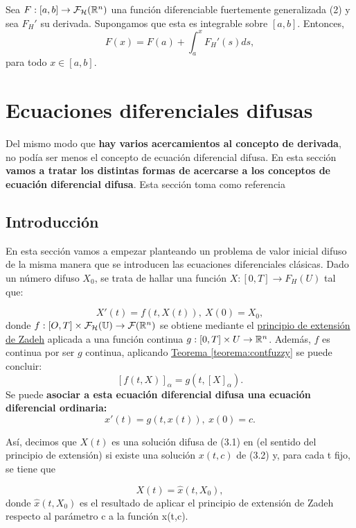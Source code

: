 \begin{teorema}
  Sea $F : [a, b] \rightarrow  \mathcal{F}_\mathcal{H} (\mathbb R^n)$ una función diferenciable fuertemente generalizada (2) y sea $F_H'$ su derivada. Supongamos que esta es integrable sobre $[a, b]$. Entonces,
  \[
  F(x) = F(a) + \int_{a}^{x}F_H'(s) ds,
  \]
  para todo $x \in [a, b]$.
\end{teorema}

\section{Ecuaciones diferenciales difusas}
Del mismo modo que \textbf{hay varios acercamientos al concepto de derivada}, no podía ser menos el concepto de ecuación diferencial difusa. En esta sección \textbf{vamos a tratar los distintas formas de acercarse a los conceptos de ecuación diferencial difusa}. Esta sección toma como referencia \cite{fuzzyapproaches}

\subsection{Introducción}
En esta sección vamos a empezar planteando un problema de valor inicial difuso de la misma manera que se introducen las ecuaciones diferenciales clásicas. Dado un número difuso $X_0$, se trata de hallar una función $X:[0,T] \rightarrow F_H(U)$ tal que:

\begin{equation}
  \label{def:edf}
  X'(t) = f(t, X(t)), ~ X(0) = X_0,
\end{equation}
donde $f : [O, T] \times \mathcal{F}_\mathcal{H}(\mathbb U) \rightarrow \mathcal{F}(\mathbb R^n)$ se obtiene mediante el \hyperref[def:zadeh]{principio de extensión de Zadeh} aplicada a una función continua $g : [0, T] \times U \rightarrow \mathbb R^n$. Además, $f$  es continua por ser $g$ continua, aplicando \hyperref[teorema:contfuzzy]{Teorema \ref*{teorema:contfuzzy}} se puede concluir:
\[
	[f(t, X)]_\alpha = g(t, [X]_\alpha).
\]
Se puede \textbf{asociar a esta ecuación diferencial difusa una ecuación diferencial ordinaria:}
\begin{equation}
	\label{eq:edo}
	x'(t) = g(t, x(t)), ~ x(0) = c.
\end{equation}

Así, decimos que $X(t)$ es una solución difusa de (3.1) en (el sentido del principio de extensión) si existe una solución $x(t,c)$ de (3.2) y, para cada t fijo, se tiene que

\[
X(t) = \hat x (t, X_0),
\]
donde $\hat x(t, X_0)$ es el resultado de aplicar el principio de extensión de Zadeh respecto al parámetro c a la función x(t,c).
